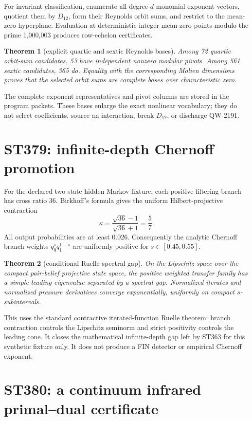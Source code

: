 \documentclass[11pt,a4paper]{article}
\newtheorem{theorem}{Theorem}[section]
\begin{document}
For invariant classification, enumerate all degree-$d$ monomial exponent vectors, quotient
them by $D_{12}$, form their Reynolds orbit sums, and restrict to the mean-zero hyperplane.
Evaluation at deterministic integer mean-zero points modulo the prime 1,000,003 produces
row-echelon certificates.

\begin{theorem}[explicit quartic and sextic Reynolds bases]
Among 72 quartic orbit-sum candidates, 53 have independent nonzero modular pivots. Among 561
sextic candidates, 365 do. Equality with the corresponding Molien dimensions proves that
the selected orbit sums are complete bases over characteristic zero.
\end{theorem}

The complete exponent representatives and pivot columns are stored in the program packets.
These bases enlarge the exact nonlinear vocabulary; they do not select coefficients, source
an interaction, break $D_{12}$, or discharge QW-2191.

\section{ST379: infinite-depth Chernoff promotion}

For the declared two-state hidden Markov fixture, each positive filtering branch has cross
ratio 36. Birkhoff's formula gives the uniform Hilbert-projective contraction
\[
\kappa=\frac{\sqrt{36}-1}{\sqrt{36}+1}=\frac57.
\]
All output probabilities are at least 0.026. Consequently the analytic Chernoff branch
weights $q_0^s q_1^{1-s}$ are uniformly positive for $s\in[0.45,0.55]$.

\begin{theorem}[conditional Ruelle spectral gap]
On the Lipschitz space over the compact pair-belief projective state space, the positive
weighted transfer family has a simple leading eigenvalue separated by a spectral gap.
Normalized iterates and normalized pressure derivatives converge exponentially, uniformly
on compact $s$-subintervals.
\end{theorem}

This uses the standard contractive iterated-function Ruelle theorem: branch contraction
controls the Lipschitz seminorm and strict positivity controls the leading cone. It closes
the mathematical infinite-depth gap left by ST363 for this synthetic fixture only. It does
not produce a FIN detector or empirical Chernoff exponent.

\section{ST380: a continuum infrared primal--dual certificate}
\end{document}
